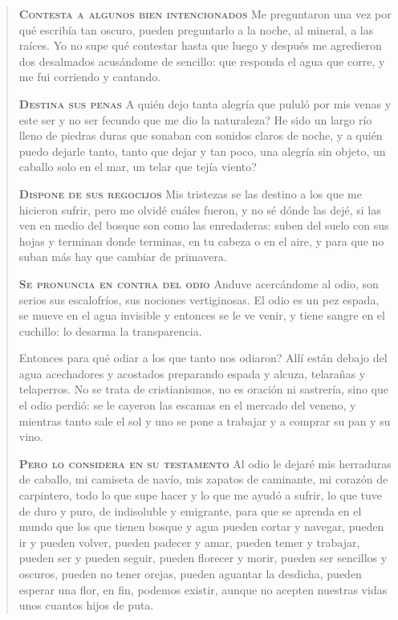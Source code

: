 \documentclass[12pt]{article}
\begin{document}
\begin{verse}
\vspace{\baselineskip}
{\scshape\bfseries Contesta a algunos bien intencionados}
Me preguntaron una vez  
por qué escribía tan oscuro,  
pueden preguntarlo a la noche,  
al mineral, a las raíces.  
Yo no supe qué contestar  
hasta que luego y después  
me agredieron dos desalmados  
acusándome de sencillo:  
que responda el agua que corre,  
y me fui corriendo y cantando.  

\vspace{\baselineskip}
{\scshape\bfseries Destina sus penas}
A quién dejo tanta alegría  
que pululó por mis venas  
y este ser y no ser fecundo  
que me dio la naturaleza?  
He sido un largo río lleno  
de piedras duras que sonaban  
con sonidos claros de noche,  
y a quién puedo dejarle tanto,  
tanto que dejar y tan poco,  
una alegría sin objeto,  
un caballo solo en el mar,  
un telar que tejía viento?  

\vspace{\baselineskip}
{\scshape\bfseries Dispone de sus regocijos}
Mis tristezas se las destino  
a los que me hicieron sufrir,  
pero me olvidé cuáles fueron,  
y no sé dónde las dejé,  
si las ven en medio del bosque  
son como las enredaderas:  
suben del suelo con sus hojas  
y terminan donde terminas,  
en tu cabeza o en el aire,  
y para que no suban más  
hay que cambiar de primavera.  

\vspace{\baselineskip}
{\scshape\bfseries Se pronuncia en contra del odio}
Anduve acercándome al odio,  
son serios sus escalofríos,  
sus nociones vertiginosas.  
El odio es un pez espada,  
se mueve en el agua invisible  
y entonces se le ve venir,  
y tiene sangre en el cuchillo:  
lo desarma la transparencia.  

Entonces para qué odiar  
a los que tanto nos odiaron?  
Allí están debajo del agua  
acechadores y acostados  
preparando espada y alcuza,  
telarañas y telaperros.  
No se trata de cristianismos,  
no es oración ni sastrería,  
sino que el odio perdió:  
se le cayeron las escamas  
en el mercado del veneno,  
y mientras tanto sale el sol  
y uno se pone a trabajar  
y a comprar su pan y su vino.  

\vspace{\baselineskip}
{\scshape\bfseries Pero lo considera en su testamento}
Al odio le dejaré  
mis herraduras de caballo,  
mi camiseta de navío,  
mis zapatos de caminante,  
mi corazón de carpintero,  
todo lo que supe hacer  
y lo que me ayudó a sufrir,  
lo que tuve de duro y puro,  
de indisoluble y emigrante,  
para que se aprenda en el mundo  
que los que tienen bosque y agua  
pueden cortar y navegar,  
pueden ir y pueden volver,  
pueden padecer y amar,  
pueden temer y trabajar,  
pueden ser y pueden seguir,  
pueden florecer y morir,  
pueden ser sencillos y oscuros,  
pueden no tener orejas,  
pueden aguantar la desdicha,  
pueden esperar una flor,  
en fin, podemos existir,  
aunque no acepten nuestras vidas  
unos cuantos hijos de puta.  


\end{verse}
\end{document}
